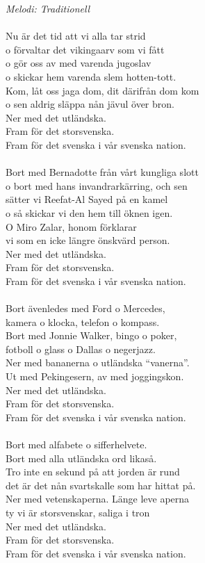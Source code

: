 {\footnotesize\textit{Melodi: Traditionell}}\\
\\
Nu är det tid att vi alla tar strid\\
o förvaltar det vikingaarv som vi fått\\
o gör oss av med varenda jugoslav\\
o skickar hem varenda slem hotten-tott.\\
Kom, låt oss jaga dom, dit därifrån dom kom\\
o sen aldrig släppa nån jävul över bron.\\
Ner med det utländska.\\
Fram för det storsvenska.\\
Fram för det svenska i vår svenska nation. \\
\\
Bort med Bernadotte från vårt kungliga slott\\
o bort med hans invandrarkärring, och sen\\
sätter vi Reefat-Al Sayed på en kamel\\
o så skickar vi den hem till öknen igen.\\
O Miro Zalar, honom förklarar\\
vi som en icke längre önskvärd person.\\
Ner med det utländska.\\
Fram för det storsvenska.\\
Fram för det svenska i vår svenska nation. \\
\\
Bort ävenledes med Ford o Mercedes,\\
kamera o klocka, telefon o kompass.\\
Bort med Jonnie Walker, bingo o poker,\\
fotboll o glass o Dallas o negerjazz.\\
Ner med bananerna o utländska ``vanerna''.\\
Ut med Pekingesern, av med joggingskon.\\
Ner med det utländska.\\
Fram för det storsvenska.\\
Fram för det svenska i vår svenska nation. \\
\\
Bort med alfabete o sifferhelvete.\\
Bort med alla utländska ord likaså.\\
Tro inte en sekund på att jorden är rund\\
det är det nån svartskalle som har hittat på.\\
Ner med vetenskaperna. Länge leve aperna\\
ty vi är storsvenskar, saliga i tron\\
Ner med det utländska.\\
Fram för det storsvenska.\\
Fram för det svenska i vår svenska nation. 
